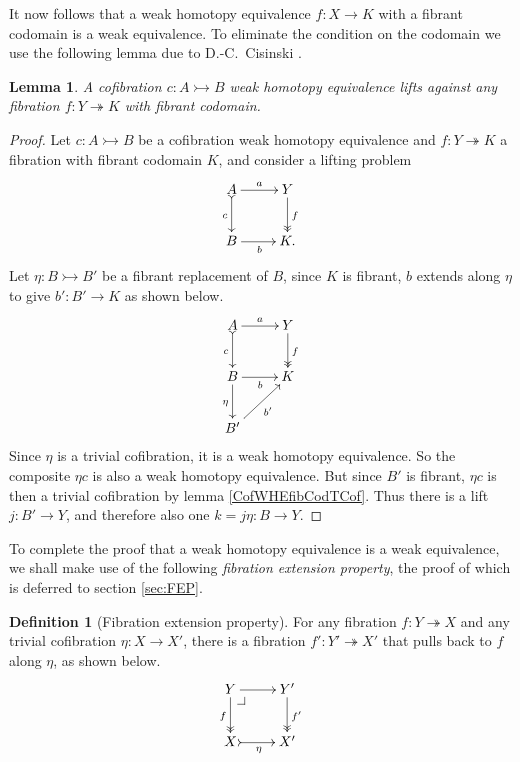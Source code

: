 \documentclass[11pt,reqno]{amsart}
\makeatletter
\newcommand{\mono}{\ensuremath{\rightarrowtail}}
\newcommand{\ra}{\ensuremath{\rightarrow}}
\renewcommand{\to}{\ensuremath{\rightarrow}}
\newcommand{\onto}{\ensuremath{\twoheadrightarrow}}
\newtheorem{lemma}[theorem]{Lemma}
\theoremstyle{remark}
\theoremstyle{definition}
\newtheorem{definition}[theorem]{Definition}
\newcommand{\pbcorner}[1][dr]{\save*!/#1-1.2pc/#1:(-1,1)@^{|-}\restore}
\makeatother
\begin{document}
It now follows that a weak homotopy equivalence $f : X \to K$ with a fibrant codomain is a weak equivalence. To eliminate the condition on the codomain we use the following lemma due to D.-C.~Cisinski \cite{cisinski-asterisque}.

\begin{lemma}\label{lemma:CofWHEiffFibLift}
A cofibration $ c : A \mono B$ weak homotopy equivalence lifts against  any fibration $f : Y\onto K$ with fibrant codomain.
\end{lemma}
%
\begin{proof}
Let $c : A\mono B$ be a cofibration weak homotopy equivalence and  $f : Y\onto K$ a fibration with fibrant codomain $K$, and consider a lifting problem
\begin{equation*}%
\xymatrix{
A \ar@{>->}[d]_{c} \ar[r]^-{a}  & Y \ar@{>>}[d]^{f} \\
B \ar[r]_{b} &  K.
}
\end{equation*}
Let $\eta : B\mono B'$ be a fibrant replacement of $B$, since $K$ is fibrant, $b$ extends along $\eta$ to give $b' : B'\ra K$ as shown below.   
\begin{equation*}%
\xymatrix{
A \ar@{>->}[d]_{c} \ar[r]^-{a}  & Y \ar@{>>}[d]^{f} \\
B \ar[r]_{b} \ar[d]_\eta &  K\\
B' \ar[ru]_{b'} & 
}
\end{equation*}
Since $\eta$ is a trivial cofibration, it is a weak homotopy equivalence. So the composite $\eta c$ is also a weak homotopy equivalence.  But since $B'$ is fibrant, $\eta c$ is then a trivial cofibration by lemma \ref{CofWHEfibCodTCof}.  Thus there is a lift $j : B'\ra Y$, and therefore also one $k = j\eta : B\ra Y$. 
\end{proof}

To complete the proof that a weak homotopy equivalence is a weak equivalence, we shall make use of the following \emph{fibration extension property}, the proof of which is deferred to section \ref{sec:FEP}.

\begin{definition}[Fibration extension property]\label{def:fibextreplace}
For any fibration $ f : Y \onto X$ and any trivial cofibration $\eta: X\ra X'$,
there is a fibration $f' : Y' \onto X'$ that pulls back to $f$ along $\eta$, as shown below.
\begin{equation}\label{diagram:FEP}
\xymatrix{
Y \ar@{->>}[d]_{f} \ar[r]  \pbcorner & Y' \ar@{>>}[d]^{f'} \\
X \ar@{>->}[r]_{\eta} &  X'
}
\end{equation}
\end{definition}
\end{document}
